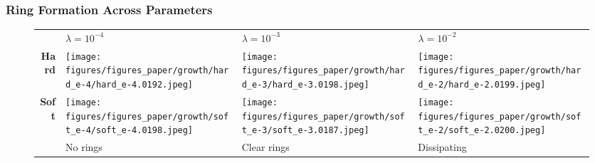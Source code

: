 \documentclass[10pt,t]{beamer}
\begin{document}
\begin{frame}
    \frametitle{Ring Formation Across Parameters}


    \vspace{-0.3cm}
    \begin{figure}
        \centering
        \begin{tabular}{r M{0.25\textwidth} M{0.25\textwidth} M{0.25\textwidth}}
                                                                                                             & $\lambda = 10^{-4}$   & $\lambda = 10^{-3}$      & $\lambda = 10^{-2}$
            \\[3pt]
            \textbf{Hard}                                                                                    &
            \texttt{[image: figures/figures\_paper/growth/hard\_e-4/hard\_e-4.0192.jpeg]} &
            \texttt{[image: figures/figures\_paper/growth/hard\_e-3/hard\_e-3.0198.jpeg]} &
            \texttt{[image: figures/figures\_paper/growth/hard\_e-2/hard\_e-2.0199.jpeg]}                                                                               \\[3pt]

            \textbf{Soft}                                                                                    &
            \texttt{[image: figures/figures\_paper/growth/soft\_e-4/soft\_e-4.0198.jpeg]} &
            \texttt{[image: figures/figures\_paper/growth/soft\_e-3/soft\_e-3.0187.jpeg]} &
            \texttt{[image: figures/figures\_paper/growth/soft\_e-2/soft\_e-2.0200.jpeg]}                                                                               \\[3pt]

                                                                                                             & \scriptsize{No rings} & \scriptsize{Clear rings} & \scriptsize{Dissipating}
        \end{tabular}
    \end{figure}

\end{frame}
\end{document}
